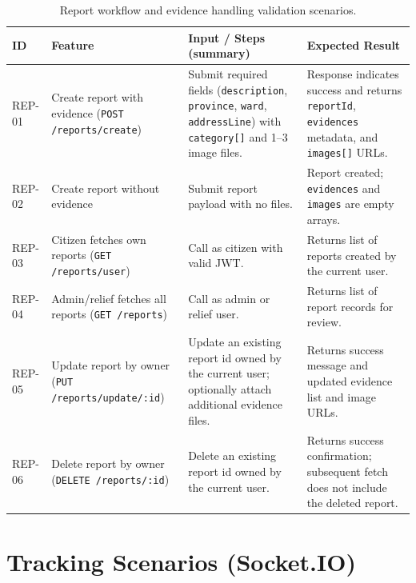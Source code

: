 \begin{table}[H]
\centering
\caption{Report workflow and evidence handling validation scenarios.}
\label{tab:appendix-report-test-cases}
\renewcommand{\arraystretch}{1.15}
\scriptsize
\setlength{\tabcolsep}{3pt}
\begin{tabularx}{\textwidth}{|p{2.0cm}|p{3.8cm}|X|p{3.2cm}|}
\hline
\textbf{ID} & \textbf{Feature} & \textbf{Input / Steps (summary)} & \textbf{Expected Result} \\
\hline
REP-01 & Create report with evidence (\texttt{POST /reports/create}) & Submit required fields (\texttt{description}, \texttt{province}, \texttt{ward}, \texttt{addressLine}) with \texttt{category[]} and 1--3 image files. & Response indicates success and returns \texttt{reportId}, \texttt{evidences} metadata, and \texttt{images[]} URLs. \\
\hline
REP-02 & Create report without evidence & Submit report payload with no files. & Report created; \texttt{evidences} and \texttt{images} are empty arrays. \\
\hline
REP-03 & Citizen fetches own reports (\texttt{GET /reports/user}) & Call as citizen with valid JWT. & Returns list of reports created by the current user. \\
\hline
REP-04 & Admin/relief fetches all reports (\texttt{GET /reports}) & Call as admin or relief user. & Returns list of report records for review. \\
\hline
REP-05 & Update report by owner (\texttt{PUT /reports/update/:id}) & Update an existing report id owned by the current user; optionally attach additional evidence files. & Returns success message and updated evidence list and image URLs. \\
\hline
REP-06 & Delete report by owner (\texttt{DELETE /reports/:id}) & Delete an existing report id owned by the current user. & Returns success confirmation; subsequent fetch does not include the deleted report. \\
\hline
\end{tabularx}
\end{table}

\section{Tracking Scenarios (Socket.IO)}

